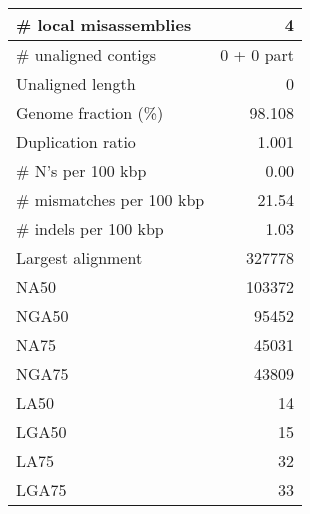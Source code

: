 \documentclass[12pt,a4paper]{article}
\begin{document}
\begin{table}[ht]
\begin{center}
\begin{tabular}{|l*{1}{|r}|}
\# local misassemblies & 4 \\ \hline
\# unaligned contigs & 0 + 0 part \\ \hline
Unaligned length & 0 \\ \hline
Genome fraction (\%) & 98.108 \\ \hline
Duplication ratio & 1.001 \\ \hline
\# N's per 100 kbp & 0.00 \\ \hline
\# mismatches per 100 kbp & 21.54 \\ \hline
\# indels per 100 kbp & 1.03 \\ \hline
Largest alignment & 327778 \\ \hline
NA50 & 103372 \\ \hline
NGA50 & 95452 \\ \hline
NA75 & 45031 \\ \hline
NGA75 & 43809 \\ \hline
LA50 & 14 \\ \hline
LGA50 & 15 \\ \hline
LA75 & 32 \\ \hline
LGA75 & 33 \\ \hline
\end{tabular}
\end{center}
\end{table}
\end{document}
